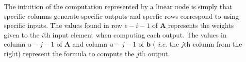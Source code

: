 

The intuition of the computation represented by a linear node is
simply that specific columns generate specific outputs and specfic
rows correspond to using specific inputs.  The values found in row
$e-i-1$ of ${\mathbf A}$ represents the weights given to the $i$th
input element when computing each output.  The values in column
$u-j-1$ of ${\mathbf A}$ and column $u-j-1$ of ${\mathbf b}$ ({\it
i.e.} the $j$th column from the right) represent the formula to
compute the $j$th output.




